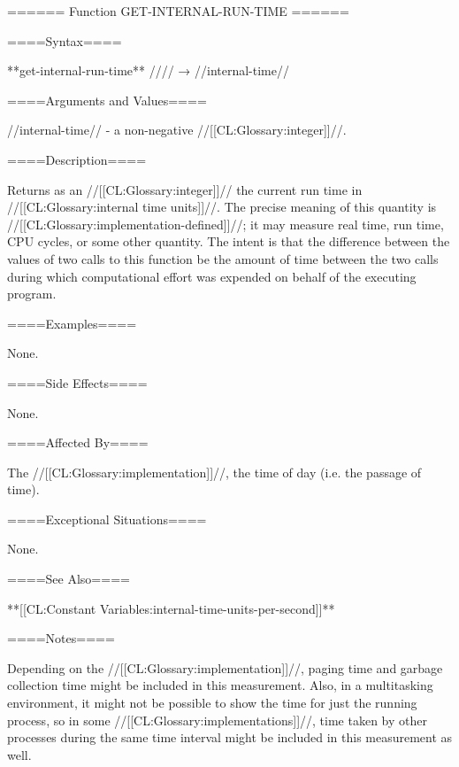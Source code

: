 ====== Function GET-INTERNAL-RUN-TIME ======

====Syntax====

**get-internal-run-time** //\noargs// → //internal-time//

====Arguments and Values====

//internal-time// - a non-negative //[[CL:Glossary:integer]]//.

====Description====

Returns as an //[[CL:Glossary:integer]]// the current run time in //[[CL:Glossary:internal time units]]//. The precise meaning of this quantity is //[[CL:Glossary:implementation-defined]]//; it may measure real time, run time, CPU cycles, or some other quantity. The intent is that the difference between the values of two calls to this function be the amount of time between the two calls during which computational effort was expended on behalf of the executing program.

====Examples====

None.

====Side Effects====

None.

====Affected By====

The //[[CL:Glossary:implementation]]//, the time of day (i.e. the passage of time).

====Exceptional Situations====

None.

====See Also====

**[[CL:Constant Variables:internal-time-units-per-second]]**

====Notes====

Depending on the //[[CL:Glossary:implementation]]//, paging time and garbage collection time might be included in this measurement. Also, in a multitasking environment, it might not be possible to show the time for just the running process, so in some //[[CL:Glossary:implementations]]//, time taken by other processes during the same time interval might be included in this measurement as well.



